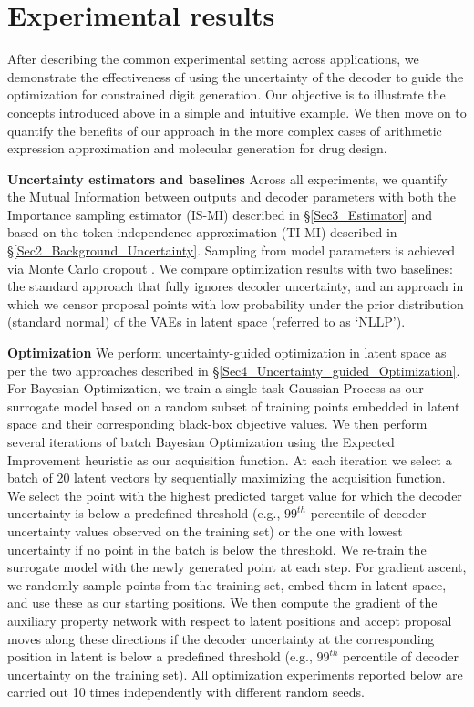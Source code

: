 \section{Experimental results}
\label{Sec5_Experiments}

After describing the common experimental setting across applications, we demonstrate the effectiveness of using the uncertainty of the decoder to guide the optimization for constrained digit generation. Our objective is to illustrate the concepts introduced above in a simple and intuitive example. We then move on to quantify the benefits of our approach in the more complex cases of arithmetic expression approximation and molecular generation for drug design. 

\textbf{Uncertainty estimators and baselines} Across all experiments, we quantify the Mutual Information between outputs and decoder parameters with both the Importance sampling estimator (IS-MI) described in \S\ref{Sec3_Estimator} and based on the token independence approximation (TI-MI) described in \S\ref{Sec2_Background_Uncertainty}. Sampling from model parameters is achieved via Monte Carlo dropout \citep{gal2016dropout}. We compare optimization results with two baselines: the standard approach that fully ignores decoder uncertainty, and an approach in which we censor proposal points with low probability under the prior distribution (standard normal) of the VAEs in latent space (referred to as `NLLP').

\textbf{Optimization} We perform uncertainty-guided optimization in latent space as per the two approaches described in \S\ref{Sec4_Uncertainty_guided_Optimization}. For Bayesian Optimization, we train a single task Gaussian Process as our surrogate model based on a random subset of training points embedded in latent space and their corresponding black-box objective values. We then perform several iterations of batch Bayesian Optimization using the Expected Improvement heuristic as our acquisition function. At each iteration we select a batch of 20 latent vectors by sequentially maximizing the acquisition function. We select the point with the highest predicted target value for which the decoder uncertainty is below a predefined threshold (e.g., $99^{th}$ percentile of decoder uncertainty values observed on the training set) or the one with lowest uncertainty if no point in the batch is below the threshold. We re-train the surrogate model with the newly generated point at each step.
For gradient ascent, we randomly sample points from the training set, embed them in latent space, and use these as our starting positions. We then compute the gradient of the auxiliary property network with respect to latent positions and accept proposal moves along these directions if the decoder uncertainty at the corresponding position in latent is below a predefined threshold (e.g., $99^{th}$ percentile of decoder uncertainty on the training set).
All optimization experiments reported below are carried out 10 times independently with different random seeds. %

